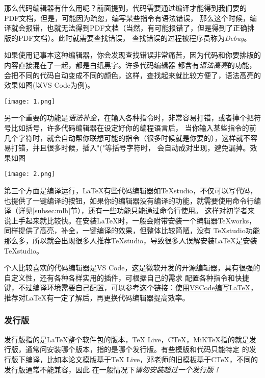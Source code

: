 那么代码编辑器有什么用呢？前面提到，代码需要通过编译才能得到我们要的PDF文档，但是，可能因为疏忽，编写某些指令有语法错误，
那么这个时候，编译就会报错，也就无法得到PDF文档（当然，有可能报错了，但是得到了正确排版的PDF文档）。此时就需要查找错误，
查找错误的过程被程序员称为\emph{Debug}。

如果使用记事本这种编辑器，你会发现查找错误非常痛苦，因为代码和你要排版的内容直接混在了一起，都是白纸黑字。许多代码编辑器
都含有\emph{语法高亮}的功能，会把不同的代码自动变成不同的颜色，这样，查找起来就比较方便了，语法高亮的效果如图(以VS Code为例)。
\begin{center}
  \texttt{[image: 1.png]}
\end{center}

另一个重要的功能是\emph{语法补全}，在输入各种指令时，非常容易打错，或者掉个把符号比如括号，许多代码编辑器在设定好你的编程语言后，
当你输入某些指令的前几个字符时，就会自动帮你联想可能的指令（很多时候就是你要的），这样就不容易打错，并且很多时候，插入"("等括号字符时，
会自动成对出现，避免漏掉。效果如图
\begin{center}
  \texttt{[image: 2.png]}
\end{center}

第三个方面是编译运行，\LaTeX{}有些代码编辑器如TeXstudio，不仅可以写代码，也提供了一键编译的按钮，如果你的编辑器没有编译的功能，就需要使用命令行编译（详见\ref{subsec:mlh}节），还有一些功能只能通过命令行使用。
这样对初学者来说上手起来就比较快。在安装\LaTeX{}时，一般会附带安装一个编辑器TeXworks，同样提供了高亮，补全，一键编译的效果，但整体比较简陋，没有
TeXstudio功能那么多，所以就会出现很多人推荐TeXstudio，导致很多人误解安装\LaTeX{}是安装TeXstudio。

个人比较喜欢的代码编辑器是VS Code，这是微软开发的开源编辑器，具有很强的自定义性，还有各种各样实用的插件，可根据自己的需求
配置各种指令和快捷键，不过编译环境需要自己配置，可以参考这个链接：\href{https://zhuanlan.zhihu.com/p/38178015?utm_source=qq&utm_medium=social&utm_oi=1122597840500740096}{使用VSCode编写LaTeX}，
推荐对\LaTeX{}有一定了解后，再更换代码编辑器提高效率。



\subsubsection{发行版}


发行版指的是\LaTeX{}整个软件包的版本，\TeX{} Live，C\TeX{}，MiK\TeX{}指的就是发行版，通常问安装哪个版本，指的是哪个发行版。有些模版和代码只能特定
的发行版下编译，比如本论文模版基于\TeX{} Live，邓老师的旧模板基于C\TeX{}，不同的发行版通常不能兼容，因此
在一般情况下\emph{请勿安装超过一个发行版！}

